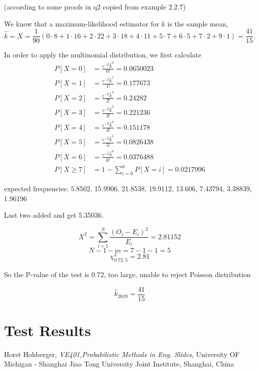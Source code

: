 \documentclass[conf]{new-aiaa}
\begin{document}
(according to some proofs in q2 copied from example 2.2.7)

We know that a maximum-likelihood estimator for $k$ is the sample mean,
$$\hat{k}=\overline{X}=\frac{1}{90}
(0\cdot8+1\cdot16+2\cdot22+3\cdot18+4\cdot11
+5\cdot7+6\cdot5+7\cdot2+9\cdot1)=\frac{41}{15}.$$

In order to apply the multinomial distribution, we first calculate
\begin{align*}
P[X=0]&=\frac{e^{-\hat{k}}\hat{k}^0}{0!}=0.0650023\\
P[X=1]&=\frac{e^{-\hat{k}}\hat{k}^1}{1!}=0.177673\\
P[X=2]&=\frac{e^{-\hat{k}}\hat{k}^2}{2!}=0.24282\\
P[X=3]&=\frac{e^{-\hat{k}}\hat{k}^3}{3!}=0.221236\\
P[X=4]&=\frac{e^{-\hat{k}}\hat{k}^4}{4!}=0.151178\\
P[X=5]&=\frac{e^{-\hat{k}}\hat{k}^5}{5!}=0.0826438\\
P[X=6]&=\frac{e^{-\hat{k}}\hat{k}^6}{6!}=0.0376488\\
P[X\geqslant7]&=1-\sum_{i=0}^6P[X=i]=0.0217996
\end{align*}

expected frequencies:
5.8502, 15.9906, 21.8538, 19.9112, 13.606, 7.43794, 3.38839, 1.96196

Last two added and get 5.35036.

$$X^2=\sum_{i=1}^N\frac{(O_i-E_i)^2}{E_i}=2.81152$$
$$N-1-m=7-1-1=5$$
$$\chi^2_{0.72,5}=2.81$$

So the P-value of the test is 0.72, too large, unable to reject Poisson distribution

$$\hat{k}_{2019}=\frac{41}{15}$$

\newpage

\section{Test Results}


\begin{thebibliography}{9}
Horst Hohberger, \emph{VE401,Probabilistic Methods in Eng. Slides}, University OF Michigan - Shanghai Jiao Tong University Joint Institute, Shanghai, China

\end{thebibliography}
\end{document}
